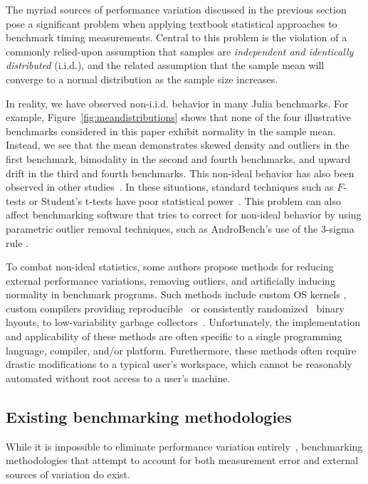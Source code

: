 \documentclass[conference]{IEEEtran}
\begin{document}
The myriad sources of performance variation discussed in the previous section pose a
significant problem when applying textbook statistical approaches to benchmark timing
measurements. Central to this problem is the violation of a commonly relied-upon assumption
that samples are \textit{independent and identically distributed} (i.i.d.), and the related
assumption that the sample mean will converge to a normal distribution as the sample size
increases.

In reality, we have observed non-i.i.d. behavior in many Julia benchmarks. For example,
Figure~\ref{fig:meandistributions} shows that none of the four illustrative benchmarks
considered in this paper exhibit normality in the sample mean. Instead, we see that the mean
demonstrates skewed density and outliers in the first benchmark, bimodality in the second
and fourth benchmarks, and upward drift in the third and fourth benchmarks. This non-ideal
behavior has also been observed in other studies~\cite{Gil2011, Chen2015,
Rehn2015,Barrett2016}. In these situations, standard techniques such as $F$-tests or
Student's t-tests have poor statistical
power~\cite{Lilja2000,Mytkowicz2009,Kalibera2013,Chen2015, Barrett2016}. This problem can
also affect benchmarking software that tries to correct for non-ideal behavior by using
parametric outlier removal techniques, such as AndroBench's use of the 3-sigma rule
\cite{Kim2012}.

To combat non-ideal statistics, some authors propose methods for reducing external
performance variations, removing outliers, and artificially inducing normality in benchmark
programs. Such methods include custom OS kernels \cite{Tessellation,Akkan2012}, custom
compilers providing reproducible~\cite{Georges2008} or consistently
randomized~\cite{Curtsinger2013} binary layouts, to low-variability garbage
collectors~\cite{Huang2004}. Unfortunately, the implementation and applicability of these
methods are often specific to a single programming language, compiler, and/or platform.
Furethermore, these methods often require drastic modifications to a typical user's
workspace, which cannot be reasonably automated without root access to a user's machine.

\subsection{Existing benchmarking methodologies}

While it is impossible to eliminate performance variation
entirely~\cite{Alcocer2015,Barrett2016}, benchmarking methodologies that attempt to account
for both measurement error and external sources of variation do exist.
\end{document}
